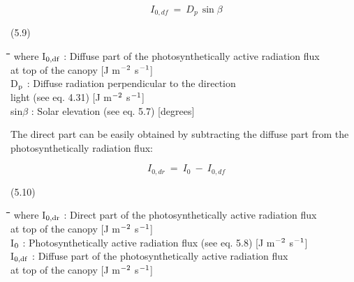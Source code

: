 \begin{displaymath}
I _{0,df} ~=~ D _{p~} \sin \beta
\end{displaymath}


\strut\hfill (5.9)\nwln
\begin{tabbing}
\hspace{1.27cm}\=\hspace{1.27cm}\=\hspace{1.27cm}\=\hspace{1.27cm}\=%
\hspace{1.27cm}\=\hspace{1.27cm}\=\hspace{1.27cm}\=\hspace{1.27cm}\=%
\hspace{1.27cm}\=\hspace{1.27cm}\=\kill
where I$_{{\rm 0,df}}$ : Diffuse part of the photosynthetically active radiation flux \\
   at top of the canopy        [J m$^{{\rm -2}}$ s$^{{\rm -1}}$]\\
D$_{{\rm p}}$ : Diffuse radiation perpendicular to the direction \\
   light (see eq. 4.31)        [J m$^{{\rm -2}}$ s$^{{\rm -1}}$]\\
sin$\beta$ : Solar elevation (see eq. 5.7)        [degrees]
\end{tabbing}



The direct part can be easily obtained by subtracting the diffuse part from the
{\nobreak}photosynthetically radiation flux:

\begin{displaymath}
I _{0,dr} ~=~ I _{0} ~-~I _{0,df} 
\end{displaymath}

 
\strut\hfill (5.10)
\nwln
\begin{tabbing}
\hspace{1.27cm}\=\hspace{1.27cm}\=\hspace{1.27cm}\=\hspace{1.27cm}\=%
\hspace{1.27cm}\=\hspace{1.27cm}\=\hspace{1.27cm}\=\hspace{1.27cm}\=%
\hspace{1.27cm}\=\hspace{1.27cm}\=\kill
where I$_{{\rm 0,dr}}$ : Direct part of the photosynthetically active radiation flux \\
   at top of the canopy        [J m$^{{\rm -2}}$ s$^{{\rm -1}}$]\\
I$_{{\rm 0}}$ : Photosynthetically active radia\-tion flux (see eq. 5.8)        [J m$^{{\rm -2}}$ s$^{{\rm -1}}$]\\
I$_{{\rm 0,df}}$ : Diffuse part of the photosynthetically active radiation flux \\
   at top of the canopy        [J m$^{{\rm -2}}$ s$^{{\rm -1}}$]
\end{tabbing}



